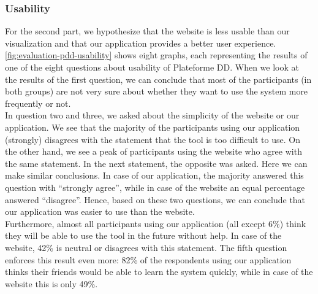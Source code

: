%	
%	

\subsubsection{Usability}
For the second part, we hypothesize that the website is less usable than our visualization and that our application provides a better user experience.\\

\autoref{fig:evaluation-pdd-usability} shows eight graphs, each representing the results of one of the eight questions about usability of Plateforme DD. When we look at the results of the first question, we can conclude that most of the participants (in both groups) are not very sure about whether they want to use the system more frequently or not.\\

In question two and three, we asked about the simplicity of the website or our application. We see that the majority of the participants using our application (strongly) disagrees with the statement that the tool is too difficult to use. On the other hand, we see a peak of participants using the website who agree with the same statement. In the next statement, the opposite was asked. Here we can make similar conclusions. In case of our application, the majority answered this question with ``strongly agree'', while in case of the website an equal percentage answered ``disagree''. Hence, based on these two questions, we can conclude that our application was easier to use than the website.\\

Furthermore, almost all participants using our application (all except 6\%) think they will be able to use the tool in the future without help. In case of the website, 42\% is neutral or disagrees with this statement. The fifth question enforces this result even more: 82\% of the respondents using our application thinks their friends would be able to learn the system quickly, while in case of the website this is only 49\%.\\

